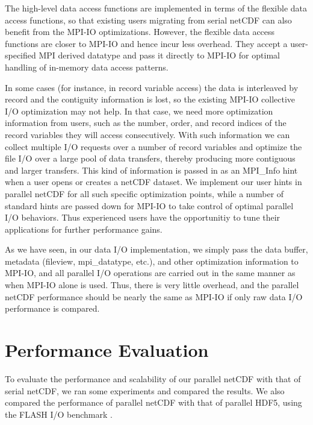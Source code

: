 \documentclass[10pt,twocolumn]{article}          %
\begin{document}
The high-level data access functions are implemented in terms of the flexible data access
functions, so that existing users migrating from serial netCDF can also benefit from the MPI-IO
optimizations. However, the flexible data access functions are closer to MPI-IO and hence incur less
overhead. They accept a user-specified MPI derived datatype and pass it directly to MPI-IO for
optimal handling of in-memory data access patterns.

In some cases (for instance, in record variable access) the data is interleaved by record and the
contiguity information is lost, so the existing MPI-IO collective I/O optimization may not help. In
that case, we need more optimization information from users, such as the number, order, and record
indices of the record variables they will access consecutively. With such information we can collect multiple
I/O requests over a number of record variables and optimize the file I/O over a large pool of data
transfers, thereby producing more contiguous and larger transfers. This kind of information is
passed in as an MPI\_Info hint when a user opens or creates a netCDF dataset. We implement our
user hints in parallel netCDF for all such specific optimization points, while a number of standard
hints are passed down for MPI-IO to take control of optimal parallel I/O behaviors. Thus
experienced users have the opportunitiy to tune their applications for further performance
gains.

As we have seen, in our data I/O implementation, we simply pass the data buffer, metadata (fileview,
mpi\_datatype, etc.), and other optimization information to MPI-IO, and all parallel I/O
operations are carried out in the same manner as when MPI-IO alone is used.  Thus, there is very little
overhead, and the parallel netCDF performance should be nearly the same as MPI-IO if only raw data
I/O performance is compared.

\section{Performance Evaluation}

To evaluate the performance and scalability of our parallel netCDF with that of serial netCDF, we ran some experiments and compared the results.
We
also compared the performance of parallel netCDF with that of parallel HDF5, using the FLASH I/O
benchmark \cite{FLASHIO}.
\end{document}
